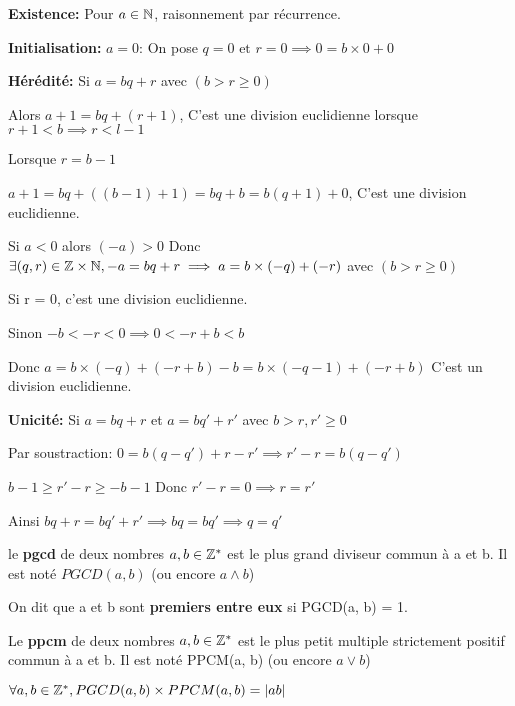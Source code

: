 \documentclass[a4paper, 12pt]{article}
\begin{document}
\begin{demonstration}
    \textbf{Existence:} Pour $a \in \mathbb{N}$, raisonnement par récurrence.

    \textbf{Initialisation:} $a = 0$: On pose $q = 0 \text{ et } r = 0 \implies 0 = b \times 0 + 0$

    \textbf{Hérédité:} Si $a = bq + r$ avec $(b \gt r \geq 0)$

    Alors $a + 1 = bq + (r + 1)$, C'est une division euclidienne lorsque $r+1 \lt b \implies r \lt l - 1$

    Lorsque $r = b-1$

    $a + 1 = bq + ((b - 1) + 1) = bq + b = b(q + 1) + 0$,
    C'est une division euclidienne.

    Si $a \lt 0$ alors $(-a) \gt 0$ Donc $\exists (q, r) \in \mathbb{Z} \times \mathbb{N}, -a = bq + r \implies a = b \times (-q) + (-r)$ avec $(b \gt r \geq 0)$

    Si r = 0, c'est une division euclidienne.

    Sinon $-b \lt -r \lt 0 \implies 0 \lt -r + b \lt b$

    Donc $a = b \times (-q) + (-r + b) - b = b \times (-q - 1) + (-r + b)$
    C'est un division euclidienne.

    \textbf{Unicité:} Si $a = bq + r$ et $a = bq' + r'$ avec $b \gt r, r' \geq 0$

    Par soustraction: $0 = b(q - q') + r - r' \implies r' - r = b(q - q')$

    $b - 1 \geq r' - r \geq -b - 1$
    Donc $r' - r = 0 \implies r = r'$

    Ainsi $bq + r = bq' + r' \implies bq = bq' \implies q = q'$
\end{demonstration}

\begin{definition}
    le \textbf{pgcd} de deux nombres $a, b \in \mathbb{Z}^*$ est le plus grand diviseur commun à a et b. Il est noté $PGCD(a, b)$ (ou encore $a \land b$)

    On dit que a et b sont \textbf{premiers entre eux} si PGCD(a, b) = 1.

    Le \textbf{ppcm} de deux nombres $a, b \in \mathbb{Z}^*$ est le plus petit multiple strictement positif commun à a et b. Il est noté PPCM(a, b) (ou encore $a \lor b$)
\end{definition}

\begin{proposition}
    $\forall a, b \in \mathbb{Z}^*, PGCD(a, b) \times PPCM(a, b) = |ab|$
\end{proposition}
\end{document}
